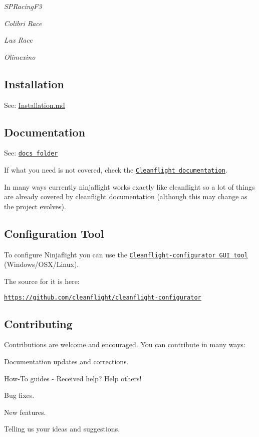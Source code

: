 {\itshape S\+P\+Racing\+F3}



{\itshape Colibri Race}



{\itshape Lux Race}



{\itshape Olimexino}

\subsection*{Installation}

See\+: \hyperlink{md_docs_Installation}{Installation.md}

\subsection*{Documentation}

See\+: \href{https://github.com/mkschreder/ninjaflight/tree/master/docs}{\tt docs folder}

If what you need is not covered, check the \href{https://github.com/cleanflight/cleanflight/tree/master/docs}{\tt Cleanflight documentation}.

In many ways currently ninjaflight works exactly like cleanflight so a lot of things are already covered by cleanflight documentation (although this may change as the project evolves).

\subsection*{Configuration Tool}

To configure Ninjaflight you can use the \href{https://chrome.google.com/webstore/detail/cleanflight-configurator/enacoimjcgeinfnnnpajinjgmkahmfgb}{\tt Cleanflight-\/configurator G\+U\+I tool} (Windows/\+O\+S\+X/\+Linux).

The source for it is here\+:

\href{https://github.com/cleanflight/cleanflight-configurator}{\tt https\+://github.\+com/cleanflight/cleanflight-\/configurator}

\subsection*{Contributing}

Contributions are welcome and encouraged. You can contribute in many ways\+:


\begin{DoxyItemize}
\item Documentation updates and corrections.
\item How-\/\+To guides -\/ Received help? Help others!
\item Bug fixes.
\item New features.
\item Telling us your ideas and suggestions.
\end{DoxyItemize}

